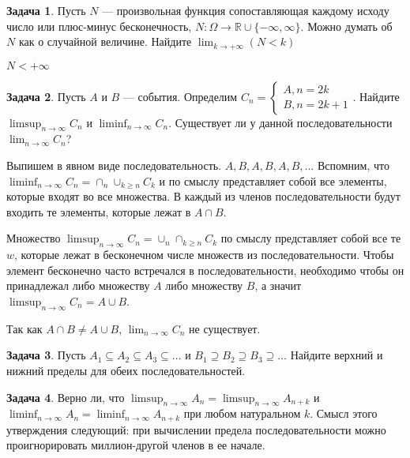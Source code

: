 \documentclass[pdftex, 12pt, a4paper]{article}
\def\R{\ensuremath{\mathbb{R}}} %
\renewcommand{\to}{\rightarrow}
\renewcommand{\ge}{\geqslant}
\theoremstyle{definition} %
\newtheorem{problem}{Задача}
\numberwithin{problem}{section}
\numberwithin{blits}{section}
\begin{document}
\begin{problem}
Пусть $N$ --- произвольная функция сопоставляющая каждому исходу число или плюс-минус бесконечность, $N:\Omega\to \R\cup \{-\infty,\infty\}$. Можно думать об $N$ как о случайной величине. Найдите $\lim_{k\to+\infty}(N<k)$
\begin{sol}
$N<+\infty$
\end{sol}
\end{problem}




\begin{problem}
Пусть $A$ и $B$ --- события. Определим $C_n = \begin{cases} A, n=2k \\ B, n = 2k+1 \end{cases}$. Найдите $\limsup_{n \to \infty} C_n$ и $\liminf_{n \to \infty} C_n$. Существует ли у данной последовательности $\lim_{n \to \infty} C_n$?
\begin{sol}
Выпишем в явном виде последовательность. $A,B,A,B,A,B, \ldots$ Вспомним, что $\liminf_{n \to \infty} C_n = \cap_n \cup_{k \ge n} C_k$ и по смыслу представляет собой все элементы, которые входят во все множества. В каждый из членов последовательности будут входить те элементы, которые лежат в $A \cap B$.

 Множество $\limsup_{n \to \infty} C_n = \cup_n \cap_{k \ge n} C_k$ по смыслу представляет собой все те $w$, которые лежат в бесконечном числе множеств из последовательности. Чтобы элемент бесконечно часто встречался в последовательности, необходимо чтобы он принадлежал либо множеству $A$ либо множеству $B$, а значит $\limsup_{n \to \infty} C_n = A \cup B$.  

Так как $A \cap B \ne A \cup B$, $\lim_{n \to \infty} C_n$ не существует.
\end{sol}
\end{problem}




\begin{problem}
Пусть $A_1 \subseteq A_2 \subseteq A_3 \subseteq \ldots$ и $B_1 \supseteq B_2 \supseteq B_3 \supseteq \ldots$ Найдите верхний и нижний пределы для обеих последовательностей. 
\begin{sol}



\end{sol}
\end{problem}




\begin{problem}
Верно ли, что $\limsup_{n \to \infty} A_n = \limsup_{n \to \infty} A_{n+k}$ и $\liminf_{n \to \infty} A_n = \liminf_{n \to \infty} A_{n+k}$ при любом натуральном $k$. Смысл этого утверждения следующий: при вычислении предела последовательности можно проигнорировать миллион-другой членов в ее начале.
\begin{sol}

\end{sol}
\end{problem}
\end{document}
